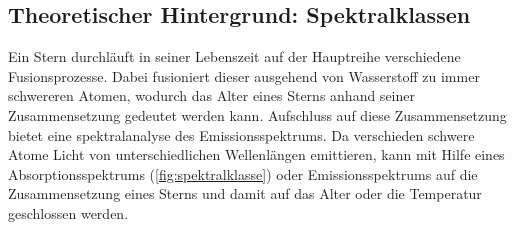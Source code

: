 \subsection{Theoretischer Hintergrund: Spektralklassen}
Ein Stern durchläuft in seiner Lebenszeit auf der Hauptreihe verschiedene Fusionsprozesse.
Dabei fusioniert dieser ausgehend von Wasserstoff zu immer schwereren Atomen, wodurch das Alter eines Sterns anhand seiner Zusammensetzung gedeutet werden kann.
Aufschluss auf diese Zusammensetzung bietet eine spektralanalyse des Emissionsspektrums.
Da verschieden schwere Atome Licht von unterschiedlichen Wellenlängen emittieren, kann mit Hilfe eines Absorptionsspektrums (\ref{fig:spektralklasse}) oder Emissionsspektrums auf die Zusammensetzung eines Sterns und damit auf das Alter oder die Temperatur geschlossen werden.
